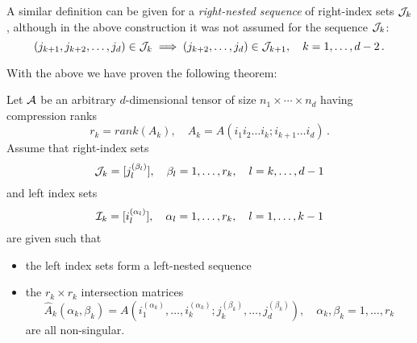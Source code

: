 A similar definition can be given for a \emph{right-nested sequence} of right-index sets $\mathcal{J}_k$, although in the above construction it was not assumed for the sequence $\mathcal{J}_k$:
\begin{equation*}
  (j_{k+1},j_{k+2},\ldots,j_d) \in \mathcal{J}_k \implies (j_{k+2},\ldots,j_d) \in \mathcal{J}_{k+1}, \quad k=1,\ldots,d-2\, .
\end{equation*}

With the above we have proven the following theorem:
\begin{Teo}
  Let $\mathcal{A}$ be an arbitrary $d$-dimensional tensor of size $n_1 \times \cdots \times n_d$ having compression ranks
  \begin{equation*}
    r_k = rank(A_k), \quad A_k = A(i_1 i_2 \ldots i_k;i_{k+1} \ldots i_d)\, .
  \end{equation*}
  Assume that right-index sets
  \begin{equation*}
    \mathcal{J}_k = [j_l^{(\beta_l)}], \quad \beta_l = 1,\ldots,r_k, \quad l = k,\ldots,d-1
  \end{equation*}
  and left index sets
  \begin{equation*}
    \mathcal{I}_k = [i_l^{(\alpha_l)}], \quad \alpha_l = 1,\ldots,r_k, \quad l = 1,\ldots,k-1
  \end{equation*}
  are given such that
  \begin{itemize}
  \item the left index sets form a left-nested sequence
  \item the $r_k \times r_k$ intersection matrices
    \begin{equation*}
      \hat{A}_k(\alpha_k,\beta_k) = A(i_1^{(\alpha_k)}, \ldots, i_k^{(\alpha_k)}; j_k^{(\beta_k)}, \ldots, j_d^{(\beta_k)}), \quad \alpha_k,\beta_k = 1,\ldots,r_k
    \end{equation*}
    are all non-singular.
  \end{itemize}


\end{Teo}
